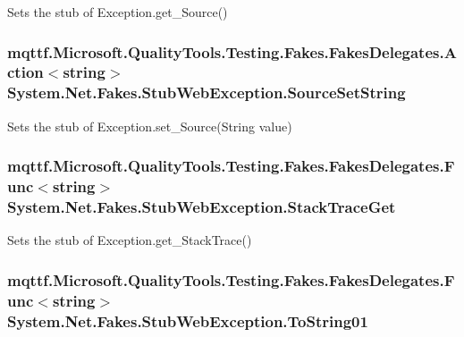 Sets the stub of Exception.\-get\-\_\-\-Source()

\hypertarget{class_system_1_1_net_1_1_fakes_1_1_stub_web_exception_a540dab04a58c098410d8e84487579bc9}{
\subsubsection[{Source\-Set\-String}]{\setlength{\rightskip}{0pt plus 5cm}mqttf.\-Microsoft.\-Quality\-Tools.\-Testing.\-Fakes.\-Fakes\-Delegates.\-Action$<$string$>$ System.\-Net.\-Fakes.\-Stub\-Web\-Exception.\-Source\-Set\-String}}\label{class_system_1_1_net_1_1_fakes_1_1_stub_web_exception_a540dab04a58c098410d8e84487579bc9}


Sets the stub of Exception.\-set\-\_\-\-Source(\-String value)

\hypertarget{class_system_1_1_net_1_1_fakes_1_1_stub_web_exception_abeb67f8cfee100900d916eb654fc3b21}{
\subsubsection[{Stack\-Trace\-Get}]{\setlength{\rightskip}{0pt plus 5cm}mqttf.\-Microsoft.\-Quality\-Tools.\-Testing.\-Fakes.\-Fakes\-Delegates.\-Func$<$string$>$ System.\-Net.\-Fakes.\-Stub\-Web\-Exception.\-Stack\-Trace\-Get}}\label{class_system_1_1_net_1_1_fakes_1_1_stub_web_exception_abeb67f8cfee100900d916eb654fc3b21}


Sets the stub of Exception.\-get\-\_\-\-Stack\-Trace()

\hypertarget{class_system_1_1_net_1_1_fakes_1_1_stub_web_exception_afd5f22a8bd687c2d0cad433dcdca1563}{
\subsubsection[{To\-String01}]{\setlength{\rightskip}{0pt plus 5cm}mqttf.\-Microsoft.\-Quality\-Tools.\-Testing.\-Fakes.\-Fakes\-Delegates.\-Func$<$string$>$ System.\-Net.\-Fakes.\-Stub\-Web\-Exception.\-To\-String01}}\label{class_system_1_1_net_1_1_fakes_1_1_stub_web_exception_afd5f22a8bd687c2d0cad433dcdca1563}


